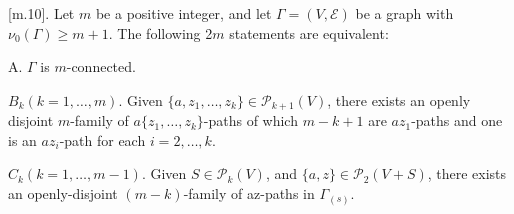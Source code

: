 [m.10]. Let $m$ be a positive integer, and let $\Gamma = (V, \mathcal{E})$ be a graph with $\nu_0(\Gamma) \geq m + 1$. The following 2$m$ statements are equivalent:

A. $\Gamma$ is $m$-connected.

$B_k(k = 1, \ldots, m)$. Given $\{a, z_1, \ldots, z_k\} \in \mathcal{P}_{k+1}(V)$, there exists an openly disjoint $m$-family of $a\{z_1, \ldots, z_k\}$-paths of which $m - k + 1$ are $az_1$-paths and one is an $az_i$-path for each $i = 2, \ldots, k$.

$C_k(k = 1, \ldots, m - 1)$. Given $S \in \mathcal{P}_k(V)$, and $\{a, z\} \in \mathcal{P}_2(V + S)$, there exists an openly-disjoint $(m - k)$-family of az-paths in $\Gamma_{(s)}$.
